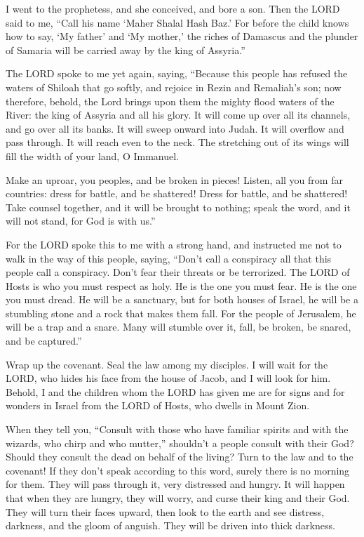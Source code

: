 \myverse{}I went to the prophetess, and she conceived, and bore a son. Then
the LORD said to me, “Call his name ‘Maher Shalal Hash Baz.’
\myverse{}For before the child knows how to say, ‘My father’ and ‘My mother,’ the riches
of Damascus and the plunder of Samaria will be carried away by the king of Assyria.”

\myverse{}The LORD spoke to me yet again, saying,
\myverse{}“Because this people has refused the waters of Shiloah that go softly, and rejoice
in Rezin and Remaliah’s son;
\myverse{}now therefore, behold, the Lord brings upon them the mighty flood waters of
the River: the king of Assyria and all his glory. It will come up over all its channels, and go over all
its banks.
\myverse{}It will sweep onward into Judah. It will overflow and pass through. It will
reach even to the neck. The stretching out of its wings will fill the width of your land, O Immanuel.

\myverse{}Make an uproar, you peoples, and be broken in pieces! Listen, all
you from far countries: dress for battle, and be shattered! Dress for battle, and be shattered!
\myverse{}Take counsel together, and it will be brought to nothing; speak the word,
and it will not stand, for God is with us.”

\myverse{}For the LORD spoke this to me with a strong hand, and instructed
me not to walk in the way of this people, saying,
\myverse{}“Don’t call a conspiracy all that this people call a conspiracy. Don’t fear
their threats or be terrorized.
\myverse{}The LORD of Hosts is who you must respect as holy. He is the one you must
fear. He is the one you must dread.
\myverse{}He will be a sanctuary, but for both houses of Israel, he will be a stumbling
stone and a rock that makes them fall. For the people of Jerusalem, he will be a trap and a snare.
\myverse{}Many will stumble over it, fall, be broken, be snared, and be captured.”

\myverse{}Wrap up the covenant. Seal the law among my disciples.
\myverse{}I will wait for the LORD, who hides his face from the house of Jacob, and
I will look for him.
\myverse{}Behold, I and the children whom the LORD has given me are for signs and for
wonders in Israel from the LORD of Hosts, who dwells in Mount Zion.

\myverse{}When they tell you, “Consult with those who have familiar spirits
and with the wizards, who chirp and who mutter,” shouldn’t a people consult with their God? Should they
consult the dead on behalf of the living?
\myverse{}Turn to the law and to the covenant! If they don’t speak according to this
word, surely there is no morning for them.
\myverse{}They will pass through it, very distressed and hungry. It will happen that
when they are hungry, they will worry, and curse their king and their God. They will turn their faces
upward,
\myverse{}then look to the earth and see distress, darkness, and the gloom of anguish.
They will be driven into thick darkness.


